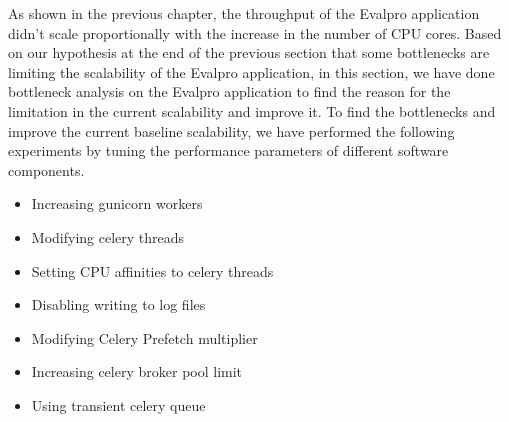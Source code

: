 \documentclass{iitbreport}
\begin{document}
As shown in the previous chapter, the throughput of the Evalpro application didn't scale proportionally with the increase in the number of CPU cores. Based on our hypothesis at the end of the previous section that some bottlenecks are limiting the scalability of the Evalpro application, in this section, we have done bottleneck analysis on the Evalpro application to find the reason for the limitation in the current scalability and improve it. To find the bottlenecks and improve the current baseline scalability, we have performed the following experiments by tuning the performance parameters of different software components.
\begin{itemize}
    \item
    Increasing gunicorn workers
    \item
    Modifying celery threads
    \item
    Setting CPU affinities to celery threads
    \item
    Disabling writing to log files
    \item
    Modifying Celery Prefetch multiplier
    \item
    Increasing celery broker pool limit
    \item
    Using transient celery queue
\end{itemize}
\end{document}
